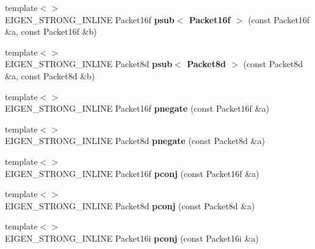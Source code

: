 \begin{DoxyCompactItemize}
{\footnotesize template$<$$>$ }\\E\+I\+G\+E\+N\+\_\+\+S\+T\+R\+O\+N\+G\+\_\+\+I\+N\+L\+I\+NE Packet16f {\bfseries psub$<$ Packet16f $>$} (const Packet16f \&a, const Packet16f \&b)
\item 
\mbox{\label{namespace_eigen_1_1internal_a0c048616f4bb90d8d38404252af27d37}} 
{\footnotesize template$<$$>$ }\\E\+I\+G\+E\+N\+\_\+\+S\+T\+R\+O\+N\+G\+\_\+\+I\+N\+L\+I\+NE Packet8d {\bfseries psub$<$ Packet8d $>$} (const Packet8d \&a, const Packet8d \&b)
\item 
\mbox{\label{namespace_eigen_1_1internal_a16a393201cd10d13afa03c5ae6b03ab8}} 
{\footnotesize template$<$$>$ }\\E\+I\+G\+E\+N\+\_\+\+S\+T\+R\+O\+N\+G\+\_\+\+I\+N\+L\+I\+NE Packet16f {\bfseries pnegate} (const Packet16f \&a)
\item 
\mbox{\label{namespace_eigen_1_1internal_a3a08ac40ab96ccff59ceb316d60236a3}} 
{\footnotesize template$<$$>$ }\\E\+I\+G\+E\+N\+\_\+\+S\+T\+R\+O\+N\+G\+\_\+\+I\+N\+L\+I\+NE Packet8d {\bfseries pnegate} (const Packet8d \&a)
\item 
\mbox{\label{namespace_eigen_1_1internal_a904533c8d3af6a2efc9955b32fe0575e}} 
{\footnotesize template$<$$>$ }\\E\+I\+G\+E\+N\+\_\+\+S\+T\+R\+O\+N\+G\+\_\+\+I\+N\+L\+I\+NE Packet16f {\bfseries pconj} (const Packet16f \&a)
\item 
\mbox{\label{namespace_eigen_1_1internal_aee7a888ababe7e2e104695b6e7d469a2}} 
{\footnotesize template$<$$>$ }\\E\+I\+G\+E\+N\+\_\+\+S\+T\+R\+O\+N\+G\+\_\+\+I\+N\+L\+I\+NE Packet8d {\bfseries pconj} (const Packet8d \&a)
\item 
\mbox{\label{namespace_eigen_1_1internal_a41d8d3eb1142dbc5d5ce8a3afdfb64ef}} 
{\footnotesize template$<$$>$ }\\E\+I\+G\+E\+N\+\_\+\+S\+T\+R\+O\+N\+G\+\_\+\+I\+N\+L\+I\+NE Packet16i {\bfseries pconj} (const Packet16i \&a)
\item 
\mbox{\label{namespace_eigen_1_1internal_a87244fb1620331cf859e4d7b5ce84800}} 

\end{DoxyCompactItemize}
